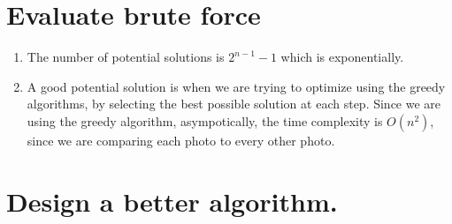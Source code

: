 \documentclass[12pt]{article}
\begin{document}
\section{Evaluate brute force}

\begin{enumerate}
    \item The number of potential solutions is $2^{n - 1} - 1$ which is exponentially.
    \item A good potential solution is when we are trying to optimize using the greedy algorithms, by selecting the best possible solution at each step.
    Since we are using the greedy algorithm, asympotically, the time complexity is $O(n^2)$, since 
    we are comparing each photo to every other photo.
\end{enumerate}

\section{Design a better algorithm.}
\end{document}
